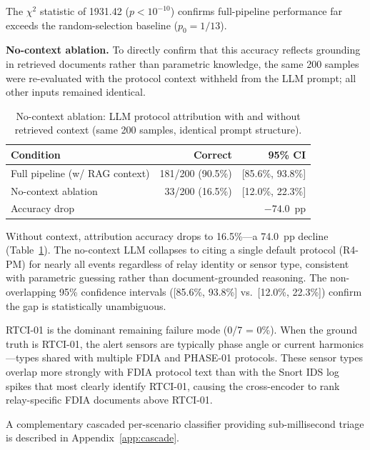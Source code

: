 \documentclass[twocolumn, 10pt, letterpaper]{article}
\begin{document}
The $\chi^2$ statistic of 1931.42 ($p < 10^{-10}$) confirms full-pipeline
performance far exceeds the random-selection baseline ($p_0 = 1/13$).

\textbf{No-context ablation.}
To directly confirm that this accuracy reflects grounding in retrieved documents
rather than parametric knowledge, the same 200 samples were re-evaluated with
the protocol context withheld from the LLM prompt; all other inputs remained
identical.

\begin{table}[H]
\centering
\caption{No-context ablation: LLM protocol attribution with and without
         retrieved context (same 200 samples, identical prompt structure).}
\label{tab:ablation}
\footnotesize
\setlength{\tabcolsep}{3pt}
\begin{tabular}{lrr}
\toprule
\textbf{Condition} & \textbf{Correct} & \textbf{95\% CI} \\
\midrule
Full pipeline (w/ RAG context) & 181/200 (90.5\%) & [85.6\%, 93.8\%] \\
No-context ablation            &  33/200 (16.5\%) & [12.0\%, 22.3\%] \\
\midrule
Accuracy drop & \multicolumn{2}{r}{$-74.0$~pp} \\
\bottomrule
\end{tabular}
\end{table}

Without context, attribution accuracy drops to 16.5\%---a 74.0~pp decline
(Table~\ref{tab:ablation}).
The no-context LLM collapses to citing a single default protocol (R4-PM)
for nearly all events regardless of relay identity or sensor type, consistent
with parametric guessing rather than document-grounded reasoning.
The non-overlapping 95\% confidence intervals ([85.6\%, 93.8\%] vs.\
[12.0\%, 22.3\%]) confirm the gap is statistically unambiguous.

RTCI-01 is the dominant remaining failure mode (0/7 = 0\%).
When the ground truth is RTCI-01, the alert sensors are typically phase angle or
current harmonics---types shared with multiple FDIA and PHASE-01 protocols.
These sensor types overlap more strongly with FDIA protocol text than with the
Snort IDS log spikes that most clearly identify RTCI-01, causing the cross-encoder
to rank relay-specific FDIA documents above RTCI-01.

A complementary cascaded per-scenario classifier providing sub-millisecond
triage is described in Appendix~\ref{app:cascade}.

\end{document}
